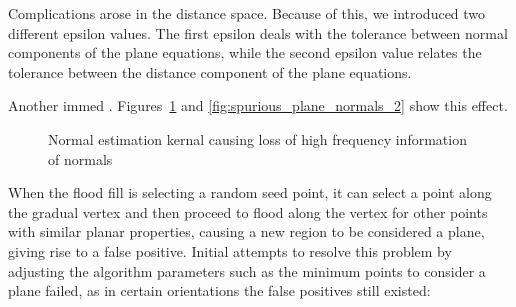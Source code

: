\documentclass[]{article}
\begin{document}
{Complications arose in the distance space. Because of this, we introduced two different epsilon values. The first epsilon deals with the tolerance between normal components of the plane equations, while the second epsilon value relates the tolerance between the distance component of the plane equations. 


Another immed	. Figures~\ref{fig:spurious_plane_normals} and \ref{fig:spurious_plane_normals_2} show this effect.




\begin{figure}[tbp]
	\centering     %
	\;

	\caption{Normal estimation kernal causing loss of high frequency information of normals}
	\label{fig:spurious_plane_normals}
\end{figure}


When the flood fill is selecting a random seed point, it can select a point along the gradual vertex and then proceed to flood along the vertex for other points with similar planar properties, causing a new region to be considered a plane, giving rise to a false positive. Initial attempts to resolve this problem by adjusting the algorithm parameters such as the minimum points to consider a plane failed, as in certain orientations the false positives still existed:


}
\end{document}
